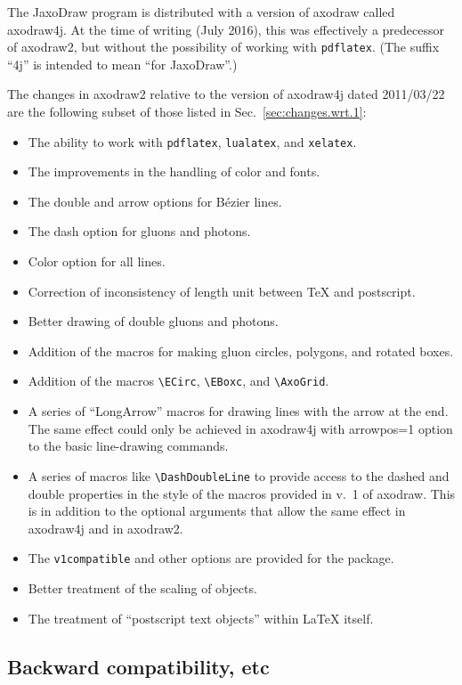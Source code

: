 \documentclass[12pt]{article}
\def\program#1{\texttt{#1}}
\begin{document}
The JaxoDraw program \cite{jaxodraw2} is distributed with a version of
axodraw called axodraw4j.  At the time of writing (July 2016), this
was effectively a predecessor of axodraw2, but without the possibility
of working with \program{pdflatex}.  (The suffix ``4j'' is intended to
mean ``for JaxoDraw''.)

The changes in axodraw2 relative to the version of axodraw4j dated
2011/03/22 are the following subset of those listed in Sec.\
\ref{sec:changes.wrt.1}:
\begin{itemize}
\item The ability to work with \program{pdflatex}, \program{lualatex},
  and  \program{xelatex}.
\item The improvements in the handling of color and fonts.
\item The double and arrow options for B\'ezier lines.
\item The dash option for gluons and photons.
\item Color option for all lines.
\item Correction of inconsistency of length unit between \TeX{} and
  postscript. 
\item Better drawing of double gluons and photons.
\item Addition of the macros for making gluon circles, polygons, and rotated
  boxes.
\item Addition of the macros
  \verb+\ECirc+, \verb+\EBoxc+, and \verb+\AxoGrid+.
\item A series of ``LongArrow'' macros for drawing lines with the
  arrow at the end.  The same effect could only be achieved in
  axodraw4j with arrowpos=1 option to the basic line-drawing
  commands.
\item A series of macros like \verb+\DashDoubleLine+ to provide access
  to the dashed and double properties in the style of the macros
  provided in v.\ 1 of axodraw.  This is in addition to the optional
  arguments that allow the same effect in axodraw4j and in axodraw2.
\item The \texttt{v1compatible} and other options are provided for the
  package.
\item Better treatment of the scaling of objects.
\item The treatment of ``postscript text objects'' within \LaTeX{}
  itself. 
\end{itemize}


\subsection{Backward compatibility, etc}
\label{sec:compat}
\end{document}
